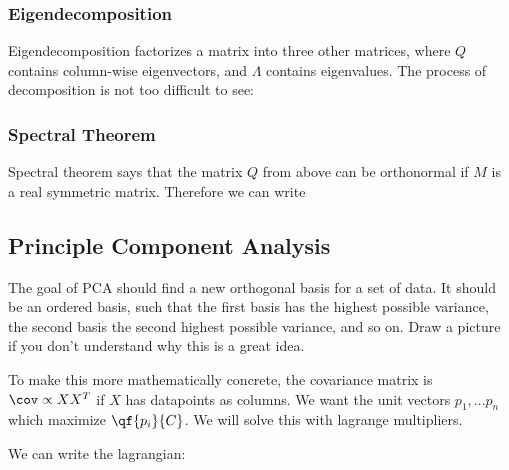 \documentclass[12pt]{article}
\begin{document}
\subsubsection{Eigendecomposition}


Eigendecomposition factorizes a matrix into three other matrices, where $Q$ contains column-wise eigenvectors, and $\Lambda$ contains eigenvalues. The process of decomposition is not too difficult to see:


\subsubsection{Spectral Theorem}

Spectral theorem says that the matrix $Q$ from above can be orthonormal if $M$ is a real symmetric matrix. Therefore we can write


\subsection{Principle Component Analysis}

The goal of PCA should find a new orthogonal basis for a set of data. It should be an ordered basis, such that the first basis has the highest possible variance, the second basis the second highest possible variance, and so on. Draw a picture if you don't understand why this is a great idea. 

To make this more mathematically concrete, the covariance matrix is $\cov \propto XX^T$ if $X$ has datapoints as columns. We want the unit vectors $p_1, ... p_n$ which maximize $\qf{p_i}{C}$. We will solve this with lagrange multipliers.


We can write the lagrangian:

\end{document}
